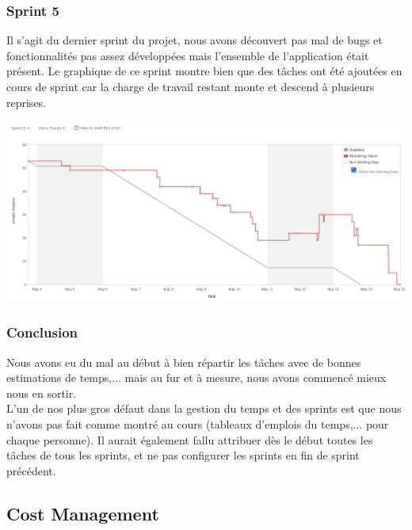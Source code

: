 \documentclass[t, 12pt, usenames,dvipsnames]{article}
\begin{document}
        
            \subsubsection{Sprint 5}
                \noindent Il s'agit du dernier sprint du projet, nous avons découvert pas mal de bugs et fonctionnalités pas assez développées mais l'ensemble de l'application était présent. Le graphique de ce sprint montre bien que des tâches ont été ajoutées en cours de sprint car la charge de travail restant monte et descend à plusieurs reprises. 
                
                \begin{center}
                    \includegraphics[scale=.25]{images/graph-new/sprint5.png}
                    \label{fig:sprint5_graph}
                \end{center}
                
                
           \subsubsection{Conclusion} 
               \noindent Nous avons eu du mal au début à bien répartir les tâches avec de bonnes estimations de temps,... mais au fur et à mesure, nous avons commencé mieux nous en sortir. \\
                L'un de nos plus gros défaut dans la gestion du temps et des sprints est que nous n'avons pas fait comme montré au cours (tableaux d'emplois du temps,... pour chaque personne). Il aurait également fallu attribuer dès le début toutes les tâches de tous les sprints, et ne pas configurer les sprints en fin de sprint précédent. 
                
        
        \subsection{Cost Management}
    
\end{document}
